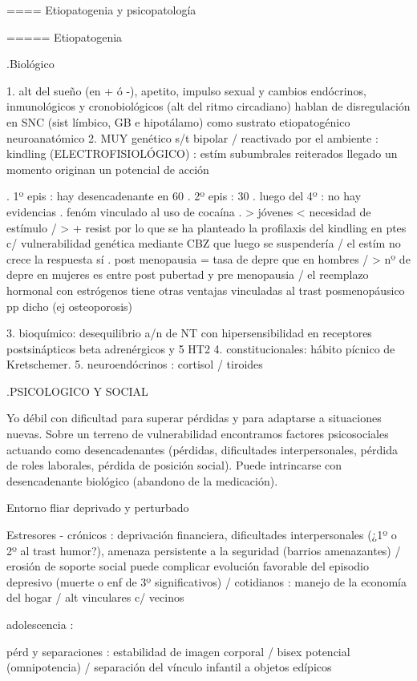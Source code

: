 ==== Etiopatogenia y psicopatología

===== Etiopatogenia

.Biológico

1. alt del sueño (en + ó -), apetito, impulso sexual y cambios endócrinos, inmunológicos y cronobiológicos (alt del ritmo circadiano) hablan de disregulación en SNC (sist límbico, GB e hipotálamo) como sustrato etiopatogénico neuroanatómico
2. MUY genético s/t bipolar / reactivado por el ambiente : kindling (ELECTROFISIOLÓGICO) : estím subumbrales reiterados llegado un momento originan un potencial de acción

. 1º epis : hay desencadenante en 60%
. 2º epis : 30%
. luego del 4º : no hay evidencias
. fenóm vinculado al uso de cocaína
. > jóvenes < necesidad de estímulo / > + resist por lo que se ha planteado la profilaxis del kindling en ptes c/ vulnerabilidad genética mediante CBZ que luego se suspendería / el estím no crece la respuesta sí
. post menopausia = tasa de depre que en hombres / > nº de depre en mujeres es entre post pubertad y pre menopausia / el reemplazo hormonal con estrógenos tiene otras ventajas vinculadas al trast posmenopáusico pp dicho (ej osteoporosis)

3. bioquímico: desequilibrio a/n de NT con hipersensibilidad en receptores postsinápticos beta adrenérgicos y 5 HT2
4. constitucionales: hábito pícnico de Kretschemer.
5. neuroendócrinos : cortisol / tiroides

.PSICOLOGICO Y SOCIAL

Yo débil con dificultad para superar pérdidas y para adaptarse a situaciones nuevas. Sobre un terreno de vulnerabilidad encontramos factores psicosociales actuando como desencadenantes (pérdidas, dificultades interpersonales, pérdida de roles laborales, pérdida de posición social). Puede intrincarse con desencadenante biológico (abandono de la medicación).

Entorno fliar deprivado y perturbado

Estresores - crónicos : deprivación financiera, dificultades interpersonales (¿1º o 2º al trast humor?), amenaza persistente a la seguridad (barrios amenazantes) / erosión de soporte social puede complicar evolución favorable del episodio depresivo (muerte o enf de 3º significativos) / cotidianos : manejo de la economía del hogar / alt vinculares c/ vecinos

adolescencia :

pérd y separaciones : estabilidad de imagen corporal / bisex potencial (omnipotencia) / separación del vínculo infantil a objetos edípicos

